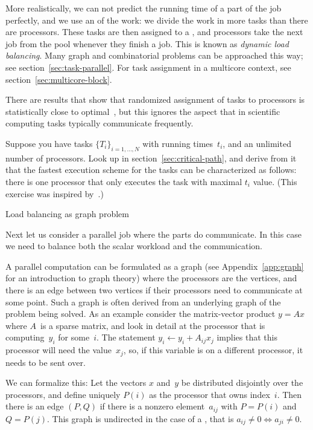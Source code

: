 More realistically, we can not predict the running time of a part of
the job perfectly, and we use an  of the
work: we divide the work in more tasks than there are
processors. These tasks are then assigned to a ,
and processors take the next job from the pool whenever they finish a
job. This is known as \emph{dynamic load
  balancing}. Many graph and
combinatorial problems can be approached this way; see
section~\ref{sec:task-parallel}. For task assignment in a multicore
context, see section~\ref{sec:multicore-block}.

There are results that show that randomized assignment of tasks to
processors is statistically close to optimal~\cite{KarpZhang88}, but
this ignores the aspect that in scientific computing tasks typically
communicate frequently.

\begin{exercise}
  Suppose you have tasks $\{T_i\}_{i=1,\ldots,N}$ with running
  times~$t_i$, and an unlimited number of processors.  Look up
   in section~\ref{sec:critical-path}, and
  derive from it that the fastest execution scheme for the tasks can
  be characterized as follows: there is one processor that
  only executes the task with maximal $t_i$ value.
  (This exercise was inspired by~\cite{Pospiech2015}.)
\end{exercise}

 {Load balancing as graph problem}
\label{sec:graph-loadbalancing}

Next let us consider a parallel job where the parts do communicate. In
this case we need to balance both the scalar workload and the
communication.

A parallel computation can be formulated as a graph (see
Appendix~\ref{app:graph} for an introduction to graph theory) where the
processors are the vertices, and there is an edge between two vertices
if their processors need to communicate at some point. Such a graph is
often derived from an underlying graph of the problem being solved.
As an example consider the matrix-vector product $y=Ax$ where
$A$~is a sparse matrix, and look in detail at the processor that is
computing~$y_i$ for some~$i$. The statement $y_i\leftarrow y_i+A_{ij}x_j$
implies that this processor will need the value~$x_j$, so, if this
variable is on a different processor, it needs to be sent over.

We can formalize this: Let the vectors $x$ and~$y$ be distributed
disjointly over the processors, and define uniquely $P(i)$ as the
processor that owns index~$i$. Then there is an edge $(P,Q)$ if there
is a nonzero element~$a_{ij}$ with $P=P(i)$ and $Q=P(j)$. This graph
is undirected in the case of a
,
that is $a_{ij}\not=0\Leftrightarrow a_{ji}\not=0$.

